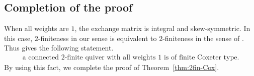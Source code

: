 \documentclass[11pt,reqno]{amsart}
\numberwithin{equation}{section}
\theoremstyle{definition}
\theoremstyle{plain}
\begin{document}
\subsection{Completion of the proof}
	When all weights are $1$, the exchange matrix is integral and skew-symmetric. In this case, $2$-finiteness in our sense is equivalent to $2$-finiteness in the sense of \cite{FZ03a}. Thus \cite[Theorem~8.6]{FZ03a} gives the following statement.
	\begin{equation}\label{eq:unit-weight-classification}
		\begin{gathered}
			\text{a connected $2$-finite quiver with all weights $1$ is of finite Coxeter type.}
		\end{gathered}
	\end{equation}
	By using this fact, we complete the proof of Theorem~\ref{thm:2fin-Cox}.
\end{document}
